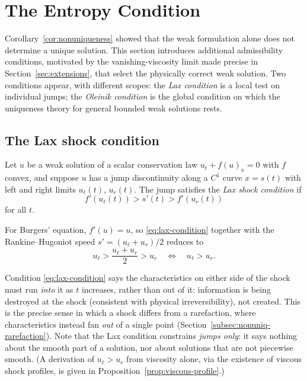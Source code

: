
\section{The Entropy Condition}
\label{sec:entropy-condition}

Corollary~\ref{cor:nonuniqueness} showed that the weak formulation alone
does not determine a unique solution. This section introduces additional
admissibility conditions, motivated by the vanishing-viscosity limit made
precise in Section~\ref{sec:extensions}, that select the physically
correct weak solution. Two conditions appear, with different scopes: the
\emph{Lax condition} is a local test on individual jumps; the
\emph{Oleinik condition} is the global condition on which the uniqueness
theory for general bounded weak solutions rests.

\subsection{The Lax shock condition}
\label{subsec:lax-condition}

\begin{definition}
\label{def:lax}
Let $u$ be a weak solution of a scalar conservation law $u_t+f(u)_x=0$
with $f$ convex, and suppose $u$ has a jump discontinuity along a $C^1$
curve $x=s(t)$ with left and right limits $u_\ell(t)$, $u_r(t)$. The jump
satisfies the \emph{Lax shock condition} if
\begin{equation}
  \label{eq:lax-condition}
  f'(u_\ell(t)) > s'(t) > f'(u_r(t))
\end{equation}
for all $t$.
\end{definition}

For Burgers' equation, $f'(u)=u$, so \eqref{eq:lax-condition} together
with the Rankine--Hugoniot speed $s'=(u_\ell+u_r)/2$ reduces to
\begin{equation}
  \label{eq:lax-burgers}
  u_\ell > \frac{u_\ell+u_r}{2} > u_r
  \quad \Longleftrightarrow \quad
  u_\ell > u_r.
\end{equation}

\begin{remark}
Condition \eqref{eq:lax-condition} says the characteristics on either side
of the shock must run \emph{into} it as $t$ increases, rather than out of
it: information is being destroyed at the shock (consistent with physical
irreversibility), not created. This is the precise sense in which a shock
differs from a rarefaction, where characteristics instead fan \emph{out}
of a single point (Section~\ref{subsec:nonuniq-rarefaction}). Note that
the Lax condition constrains \emph{jumps only}: it says nothing about the
smooth part of a solution, nor about solutions that are not piecewise
smooth. (A derivation of $u_\ell>u_r$ from viscosity alone, via the
existence of viscous shock profiles, is given in
Proposition~\ref{prop:viscous-profile}.)
\end{remark}

